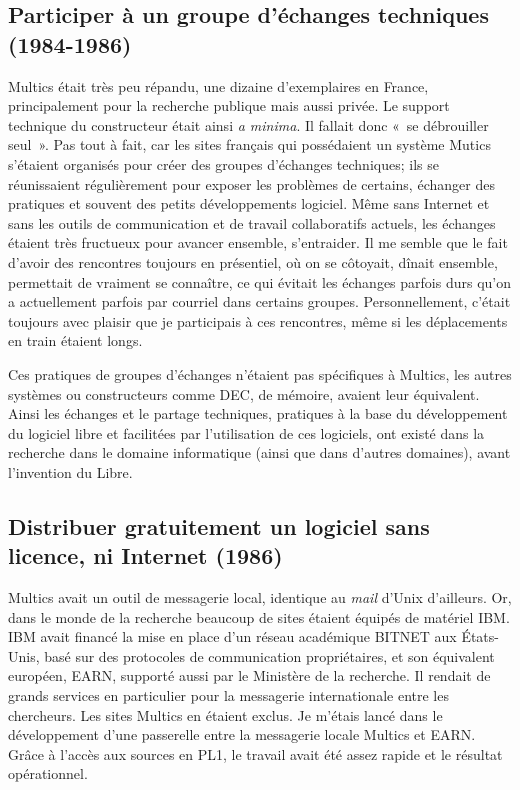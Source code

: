 \documentclass{FramateX}
\begin{document}
\begin{refsection}
\subsection*{Participer à un groupe d'échanges techniques (1984-1986)}
{}

Multics était très peu répandu, une dizaine d'exemplaires en France,
principalement pour la recherche publique mais aussi privée. Le support
technique du constructeur était ainsi \textit{a minima}. Il fallait
donc «~se débrouiller seul~». Pas tout à fait, car les sites français
qui possédaient un système Mutics s'étaient organisés pour créer des
groupes d'échanges techniques; ils se réunissaient régulièrement pour
exposer les problèmes de certains, échanger des pratiques et souvent
des petits développements logiciel. Même sans Internet et sans les
outils de communication et de travail collaboratifs actuels, les
échanges étaient très fructueux pour avancer ensemble, s'entraider. Il
me semble que le fait d'avoir des rencontres toujours en présentiel, où
on se côtoyait, dînait ensemble, permettait de vraiment se connaître,
ce qui évitait les échanges parfois durs qu'on a actuellement parfois
par courriel dans certains groupes. Personnellement, c'était toujours
avec plaisir que je participais à ces rencontres, même si les
déplacements en train étaient longs.

Ces pratiques de groupes d'échanges n'étaient pas spécifiques à Multics,
les autres systèmes ou constructeurs comme DEC, de mémoire, avaient
leur équivalent. Ainsi les échanges et le partage techniques, pratiques
à la base du développement du logiciel libre et facilitées par
l'utilisation de ces logiciels, ont existé dans la recherche dans le
domaine informatique (ainsi que dans d'autres domaines), avant
l'invention du Libre.

\subsection*{Distribuer gratuitement un logiciel sans licence, ni Internet (1986)}
{}


Multics avait un outil de messagerie local, identique au \textit{mail}
d'Unix d'ailleurs. Or, dans le monde de la recherche beaucoup de sites
étaient équipés de matériel IBM. IBM avait financé la mise en place
d'un réseau académique BITNET aux États-Unis, basé sur des protocoles
de communication propriétaires, et son équivalent européen, EARN,
supporté aussi par le Ministère de la recherche. Il rendait de grands
services en particulier pour la messagerie internationale entre les
chercheurs. Les sites Multics en étaient exclus. Je m'étais lancé dans
le développement d'une passerelle entre la messagerie locale Multics et
EARN. Grâce à l'accès aux sources en PL1, le travail avait été assez
rapide et le résultat opérationnel.


\end{refsection}
\end{document}
